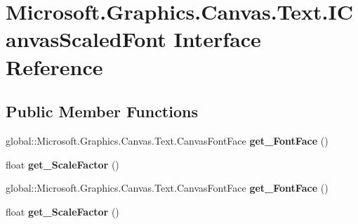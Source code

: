 \hypertarget{interface_microsoft_1_1_graphics_1_1_canvas_1_1_text_1_1_i_canvas_scaled_font}{}\section{Microsoft.\+Graphics.\+Canvas.\+Text.\+I\+Canvas\+Scaled\+Font Interface Reference}
\label{interface_microsoft_1_1_graphics_1_1_canvas_1_1_text_1_1_i_canvas_scaled_font}
\subsection*{Public Member Functions}
\begin{DoxyCompactItemize}
\item 
\mbox{\label{interface_microsoft_1_1_graphics_1_1_canvas_1_1_text_1_1_i_canvas_scaled_font_a436e710a0b960abd5f5df8368b8725ae}} 
global\+::\+Microsoft.\+Graphics.\+Canvas.\+Text.\+Canvas\+Font\+Face {\bfseries get\+\_\+\+Font\+Face} ()
\item 
\mbox{\label{interface_microsoft_1_1_graphics_1_1_canvas_1_1_text_1_1_i_canvas_scaled_font_afe414884a65c9c522daf4946562f95c2}} 
float {\bfseries get\+\_\+\+Scale\+Factor} ()
\item 
\mbox{\label{interface_microsoft_1_1_graphics_1_1_canvas_1_1_text_1_1_i_canvas_scaled_font_a436e710a0b960abd5f5df8368b8725ae}} 
global\+::\+Microsoft.\+Graphics.\+Canvas.\+Text.\+Canvas\+Font\+Face {\bfseries get\+\_\+\+Font\+Face} ()
\item 
\mbox{\label{interface_microsoft_1_1_graphics_1_1_canvas_1_1_text_1_1_i_canvas_scaled_font_afe414884a65c9c522daf4946562f95c2}} 
float {\bfseries get\+\_\+\+Scale\+Factor} ()
\item 
\mbox{\label{interface_microsoft_1_1_graphics_1_1_canvas_1_1_text_1_1_i_canvas_scaled_font_a436e710a0b960abd5f5df8368b8725ae}} 

\end{DoxyCompactItemize}
